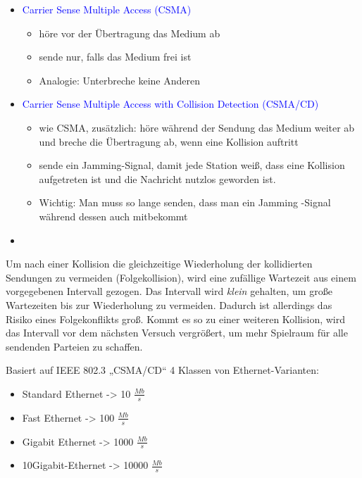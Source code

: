 \begin{itemize}
    \item \textcolor{blue}{Carrier Sense Multiple Access (CSMA)}
    \begin{itemize}
        \item höre vor der Übertragung das Medium ab
        \item sende nur, falls das Medium frei ist
        \item Analogie: Unterbreche keine Anderen
    \end{itemize}
    \item \textcolor{blue}{Carrier Sense Multiple Access with Collision Detection (CSMA/CD)}
    \begin{itemize}
        \item wie CSMA, zusätzlich: höre während der Sendung das Medium weiter ab und breche die Übertragung ab, wenn eine Kollision auftritt
        \item sende ein Jamming-Signal, damit jede Station weiß, dass eine Kollision aufgetreten ist und die Nachricht nutzlos geworden ist.
        \item Wichtig: Man muss so lange senden, dass man ein Jamming -Signal während dessen auch mitbekommt
    \end{itemize}
\end{itemize}

\begin{itemize}
    \item
\end{itemize}

Um nach einer Kollision die gleichzeitige Wiederholung der kollidierten Sendungen
zu vermeiden (Folgekollision), wird eine zufällige Wartezeit aus einem vorgegebenen
Intervall gezogen.
Das Intervall wird \textit{klein} gehalten, um große Wartezeiten
bis zur Wiederholung zu vermeiden.
Dadurch ist allerdings das Risiko eines
Folgekonflikts groß.
Kommt es so zu einer weiteren Kollision, wird das Intervall
vor dem nächsten Versuch vergrößert, um mehr Spielraum für alle sendenden
Parteien zu schaffen.

Basiert auf IEEE 802.3 „CSMA/CD“
4 Klassen von Ethernet-Varianten:
\begin{itemize}
    \item Standard Ethernet -> 10 $\frac{Mb}{s}$
    \item Fast Ethernet -> 100 $\frac{Mb}{s}$
    \item Gigabit Ethernet -> 1000 $\frac{Mb}{s}$
    \item 10Gigabit-Ethernet -> 10000 $\frac{Mb}{s}$
\end{itemize}

